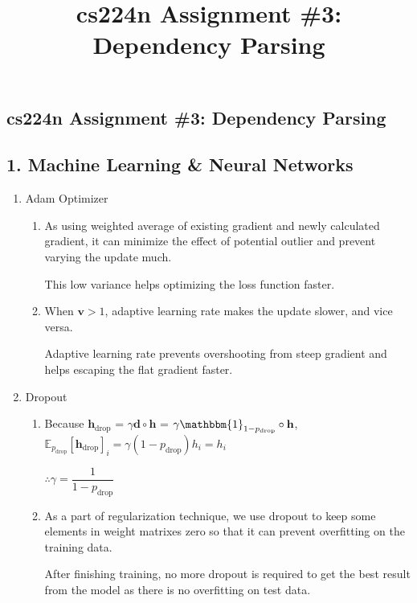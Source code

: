 \documentclass[a4paper]{article}
\title{cs224n Assignment \#3: Dependency Parsing}
\date{}
\author{}
\begin{document}
\begin{center}
    \section*{cs224n Assignment \#3: Dependency Parsing}
\end{center}
\medskip


\subsection*{1. Machine Learning \& Neural Networks}

    \begin{enumerate}[label=(\alph*)]
        \item Adam Optimizer
        \begin{enumerate}[label=\roman*.]
            \item 
            As using weighted average of existing gradient and newly calculated gradient, it can minimize the effect of potential outlier and prevent varying the update much.
            
            This low variance helps optimizing the loss function faster.
            \item 

            When $\mathbf{v}> 1$, adaptive learning rate makes the update slower, and vice versa.

            Adaptive learning rate prevents overshooting from steep gradient and helps escaping the flat gradient faster.

        \end{enumerate}
        \item Dropout
        \begin{enumerate}[label=\roman*.]
            \item Because $\mathbf{h}_{\text{drop}}$ = $\gamma\mathbf{d}\circ\mathbf{h}$ = $\gamma\mathbbm{1}_{1-p_{\text{drop}}}\circ\mathbf{h}$, 
            $\mathbb{E}_{p_{\text{drop}}}[\mathbf{h}_{\text{drop}}]_{i} = \gamma(1-p_{\text{drop}})h_{i} = h_{i}$

            $\therefore \gamma=\dfrac{1}{1-p_{\text{drop}}}$

            \item  As a part of regularization technique, we use dropout to keep some elements in weight matrixes zero so that it can prevent overfitting on the training data. 
            
            After finishing training, no more dropout is required to get the best result from the model as there is no overfitting on test data. 

        \end{enumerate}
    \end{enumerate}
\end{document}

